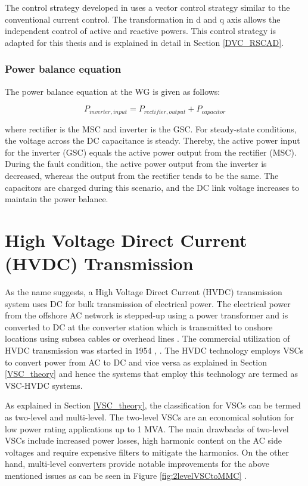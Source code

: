 The control strategy developed in \cite{korai_dynamic_2019} uses a vector control strategy similar to the conventional current control. The transformation in d and q axis allows the independent control of active and reactive powers. This control strategy is adapted for this thesis and is explained in detail in Section \ref{DVC_RSCAD}. 

\subsubsection{Power balance equation}
The power balance equation at the \gls{WG} is given as follows:

\begin{equation}\label{powbaleq}
    P_{inverter,input} = P_{rectifier,output} + P_{capacitor}  
\end{equation}

where rectifier is the \gls{MSC} and inverter is the \gls{GSC}. For steady-state conditions, the voltage across the \gls{DC} capacitance is steady. Thereby, the active power input for the inverter (\gls{GSC}) equals the active power output from the rectifier (\gls{MSC}). During the fault condition, the active power output from the inverter is decreased, whereas the output from the rectifier tends to be the same. The capacitors are charged during this scenario, and the \gls{DC} link voltage increases to maintain the power balance. 

\section{High Voltage Direct Current (HVDC) Transmission}\label{HVDC_trans_theory}
As the name suggests, a High Voltage Direct Current (\gls{HVDC}) transmission system uses \gls{DC} for bulk transmission of electrical power. The electrical power from the offshore \gls{AC} network is stepped-up using a power transformer and is converted to \gls{DC} at the converter station which is transmitted to onshore locations using subsea cables or overhead lines \cite{abbreviewnew}. The commercial utilization of \gls{HVDC} transmission was started in 1954 \cite{cigre2005b4}, \cite{peake_history_2010}. The \gls{HVDC} technology employs \gls{VSC}s to convert power from \gls{AC} to \gls{DC} and vice versa as explained in Section \ref{VSC_theory} and hence the systems that employ this technology are termed as \gls{VSC}-\gls{HVDC} systems.

As explained in Section \ref{VSC_theory}, the classification for \gls{VSC}s can be termed as two-level and multi-level. The two-level \gls{VSC}s are an economical solution for low power rating applications up to 1 MVA. The main drawbacks of two-level \gls{VSC}s include increased power losses, high harmonic content on the \gls{AC} side voltages and require expensive filters to mitigate the harmonics. On the other hand, multi-level converters provide notable improvements for the above mentioned issues as can be seen in Figure \ref{fig:2levelVSCtoMMC} \cite{sharifabadi2016design}.   

